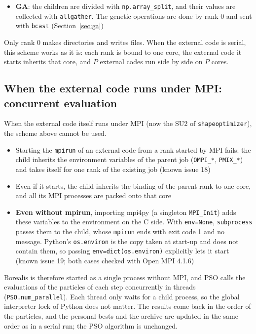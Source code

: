 \documentclass[11pt,a4paper]{article}
\begin{document}
\begin{itemize}
\item \textbf{GA}: the children are divided with \texttt{np.array\_split}, and their values are collected with \texttt{allgather}. The genetic operations are done by rank 0 and sent with \texttt{bcast} (Section~\ref{sec:ga})
\end{itemize}

Only rank 0 makes directories and writes files. When the external code is serial, this scheme works as it is: each rank is bound to one core, the external code it starts inherits that core, and $P$ external codes run side by side on $P$ cores.

\subsection{When the external code runs under MPI: concurrent evaluation}\label{sec:parallel-eval}

When the external code itself runs under MPI (now the SU2 of \texttt{shapeoptimizer}), the scheme above cannot be used.

\begin{itemize}
\item Starting the \texttt{mpirun} of an external code from a rank started by MPI fails: the child inherits the environment variables of the parent job (\texttt{OMPI\_*}, \texttt{PMIX\_*}) and takes itself for one rank of the existing job (known issue 18)
\item Even if it starts, the child inherits the binding of the parent rank to one core, and all its MPI processes are packed onto that core
\item \textbf{Even without mpirun}, importing mpi4py (a singleton \texttt{MPI\_Init}) adds these variables to the environment on the C side. With \texttt{env=None}, \texttt{subprocess} passes them to the child, whose \texttt{mpirun} ends with exit code 1 and no message. Python's \texttt{os.environ} is the copy taken at start-up and does not contain them, so passing \texttt{env=dict(os.environ)} explicitly lets it start (known issue 19; both cases checked with Open MPI 4.1.6)
\end{itemize}

Borealis is therefore started as a single process without MPI, and PSO calls the evaluations of the particles of each step concurrently in threads (\texttt{PSO.num\_parallel}). Each thread only waits for a child process, so the global interpreter lock of Python does not matter. The results come back in the order of the particles, and the personal bests and the archive are updated in the same order as in a serial run; the PSO algorithm is unchanged.
\end{document}
